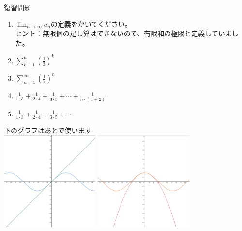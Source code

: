 \documentclass[12pt,a4paper]{jsarticle}
\begin{document}
復習問題
\begin{enumerate}
    \item $\lim_{n\to \infty}a_n$の定義をかいてください。
    \\ヒント：無限個の足し算はできないので、有限和の極限と定義していました。\everymath{\displaystyle}
    \item $\sum_{k=1}^n \left(\frac{1}{3}\right)^k$
    \item $\sum_{n=1}^\infty \left(\frac{1}{3}\right)^n$
    \item $\frac{1}{1\cdot 3}+\frac{1}{2\cdot 4}+\frac{1}{3\cdot 5}+\cdots +\frac{1}{n\cdot (n+2)}$
    \item $\frac{1}{1\cdot 3}+\frac{1}{2\cdot 4}+\frac{1}{3\cdot 5}+\cdots$
\end{enumerate}
下のグラフはあとで使います\\
\includegraphics[width=5cm]{graphs/x-and-sin.png}
\includegraphics[width=5cm]{graphs/x2-and-cos.png}
\end{document}

